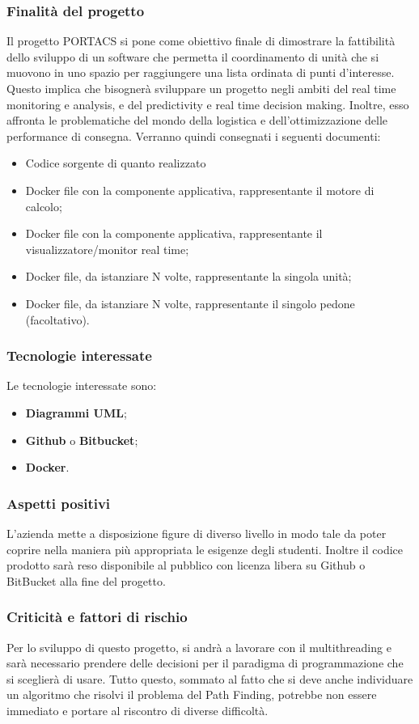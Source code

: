 \subsubsection{Finalità del progetto}
Il progetto PORTACS si pone come obiettivo finale di dimostrare la fattibilità dello sviluppo di un software che permetta il coordinamento di unità che si muovono in uno spazio per raggiungere una lista ordinata di punti d'interesse. Questo implica che bisognerà sviluppare un progetto negli ambiti del real time monitoring e analysis, e del predictivity e real time decision making. Inoltre, esso affronta le problematiche del mondo della logistica e dell'ottimizzazione delle performance di consegna.
Verranno quindi consegnati i seguenti documenti:
\begin{itemize}
	\item Codice sorgente di quanto realizzato
	\item Docker file con la componente applicativa, rappresentante il motore di calcolo;
	\item Docker file con la componente applicativa, rappresentante il visualizzatore/monitor real time;
	\item Docker file, da istanziare N volte, rappresentante la singola unità;
	\item Docker file, da istanziare N volte, rappresentante il singolo pedone (facoltativo).
\end{itemize}
\subsubsection{Tecnologie interessate}
Le tecnologie interessate sono:
\begin{itemize}
	\item \textbf{Diagrammi UML};
	\item \textbf{Github} o \textbf{Bitbucket};	
	\item \textbf{Docker}.
\end{itemize}
\subsubsection{Aspetti positivi}
L'azienda mette a disposizione figure di diverso livello in modo tale da poter coprire nella maniera più appropriata le esigenze degli studenti.
Inoltre il codice prodotto sarà reso disponibile al pubblico con licenza libera su Github o BitBucket alla fine del progetto.
\subsubsection{Criticità e fattori di rischio}
Per lo sviluppo di questo progetto, si andrà a lavorare con il multithreading e sarà necessario prendere delle decisioni per il paradigma di programmazione che si sceglierà di usare. 
Tutto questo, sommato al fatto che si deve anche individuare un algoritmo che risolvi il problema del Path Finding, potrebbe non essere immediato e portare al riscontro di diverse difficoltà.
